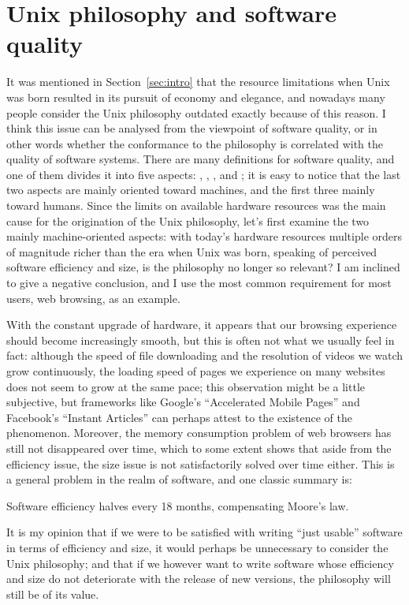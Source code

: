 \section{Unix philosophy and software quality}\label{sec:quality}

It was mentioned in Section~\ref{sec:intro} that the resource limitations when
Unix was born resulted in its pursuit of economy and elegance, and nowadays
many people consider the Unix philosophy outdated exactly because of this
reason.  I think this issue can be analysed from the viewpoint of software
quality, or in other words whether the conformance to the philosophy is
correlated with the quality of software systems.  There are many definitions for
software quality, and one of them divides it into five
aspects: , , ,
 and ; it is easy to notice that the last two
aspects are mainly oriented toward machines, and the first three mainly toward
humans.  Since the limits on available hardware resources was the main cause
for the origination of the Unix philosophy, let's first examine the two mainly
machine-oriented aspects: with today's hardware resources multiple orders of
magnitude richer than the era when Unix was born, speaking of perceived
software efficiency and size, is the philosophy no longer so relevant?
I am inclined to give a negative conclusion, and I use the most common
requirement for most users, web browsing, as an example.

With the constant upgrade of hardware, it appears that our browsing experience
should become increasingly smooth, but this is often not what we usually feel
in fact: although the speed of file downloading and the resolution of videos
we watch grow continuously, the loading speed of pages we experience on many
websites does not seem to grow at the same pace; this observation might be a
little subjective, but frameworks like Google's ``Accelerated Mobile Pages''
and Facebook's ``Instant Articles'' can perhaps attest to the existence of
the phenomenon.  Moreover, the memory consumption problem of web browsers
has still not disappeared over time, which to some extent shows that
aside from the efficiency issue, the size issue is not satisfactorily
solved over time either.  This is a general problem in the realm of
software, and one classic summary is:
\begin{quoting}
	Software efficiency halves every 18 months, compensating Moore's law.
\end{quoting}
It is my opinion that if we were to be satisfied with writing ``just usable''
software in terms of efficiency and size, it would perhaps be unnecessary to
consider the Unix philosophy; and that if we however want to write software
whose efficiency and size do not deteriorate with the release of new
versions, the philosophy will still be of its value.

